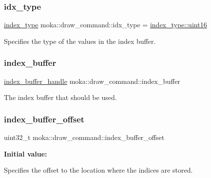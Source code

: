 \subsubsection{\texorpdfstring{idx\_type}{idx\_type}}
{\footnotesize\ttfamily \mbox{\hyperlink{namespacemoka_a32244b0de63481283738e2db11639e3f}{index\+\_\+type}} moka\+::draw\+\_\+command\+::idx\+\_\+type = \mbox{\hyperlink{namespacemoka_a32244b0de63481283738e2db11639e3faa00ef2ef85ff67b7b39339886f19044f}{index\+\_\+type\+::uint16}}}

Specifies the type of the values in the index buffer. \mbox{\label{classmoka_1_1draw__command_ab05fb02edc9e31e20ecb875ad2a496e4}} 
\subsubsection{\texorpdfstring{index\_buffer}{index\_buffer}}
{\footnotesize\ttfamily \mbox{\hyperlink{structmoka_1_1index__buffer__handle}{index\+\_\+buffer\+\_\+handle}} moka\+::draw\+\_\+command\+::index\+\_\+buffer}

The index buffer that should be used. \mbox{\label{classmoka_1_1draw__command_a2e56901ae7ccbbce13789e147606e399}} 
\subsubsection{\texorpdfstring{index\_buffer\_offset}{index\_buffer\_offset}}
{\footnotesize\ttfamily uint32\+\_\+t moka\+::draw\+\_\+command\+::index\+\_\+buffer\+\_\+offset}

{\bfseries Initial value\+:}
\begin{DoxyCode}{0}
\DoxyCodeLine{=}

\end{DoxyCode}
Specifies the offset to the location where the indices are stored. \mbox{\label{classmoka_1_1draw__command_a7ba09ac32bed07dd45d4a49284a72063}} 
